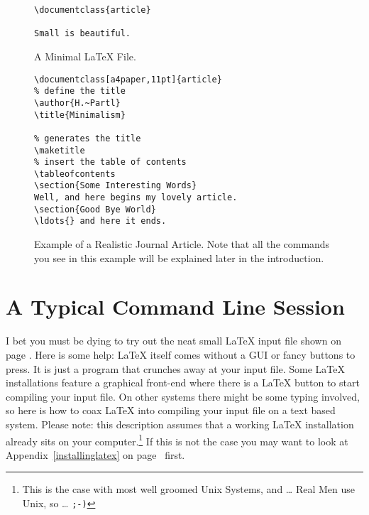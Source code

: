 \begin{figure}[!bp]
\begin{lined}{6cm}
\begin{verbatim}
\documentclass{article}

Small is beautiful.

\end{verbatim}
\end{lined}
\caption{A Minimal \LaTeX{} File.} \label{mini}
\end{figure}

\begin{figure}[!bp]
\begin{lined}{10cm}
\begin{verbatim}
\documentclass[a4paper,11pt]{article}
% define the title
\author{H.~Partl}
\title{Minimalism}

% generates the title
\maketitle
% insert the table of contents
\tableofcontents
\section{Some Interesting Words}
Well, and here begins my lovely article.
\section{Good Bye World}
\ldots{} and here it ends.

\end{verbatim}
\end{lined}
\caption[Example of a Realistic Journal Article.]{Example of a Realistic
Journal Article. Note that all the commands you see in this example will be
explained later in the introduction.} \label{document}

\end{figure}

\section{A Typical Command Line Session}

I bet you must be dying to try out the neat small \LaTeX{} input file
shown on page \pageref{mini}. Here is some help:
\LaTeX{} itself comes without a GUI or
fancy buttons to press. It is just a program that crunches away at your
input file. Some \LaTeX{} installations feature a graphical front-end where
there is a \LaTeX{} button to start compiling your input file. On other systems
there might be some typing involved, so here is how to coax \LaTeX{} into
compiling your input file on a text based system. Please note: this
description assumes that a working \LaTeX{} installation already sits on
your computer.\footnote{This is the case with most well groomed Unix
Systems, and \ldots{} Real Men use Unix, so \ldots{} \texttt{;-)}} If this is 
not the case you may want to look at Appendix~\ref{installinglatex} 
on page~\pageref{installinglatex} first.

